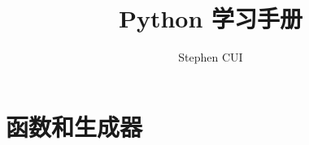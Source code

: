 \documentclass{book}
\author{Stephen CUI}
\title{Python 学习手册}
\begin{document}
\frontmatter
\tableofcontents
\mainmatter
\part{\label{p1}}
\part{\label{p2}}
\part{\label{p3}}



\part{函数和生成器\label{p4}}




\part{\label{p5}}
\part{\label{p6}}

\end{document}
